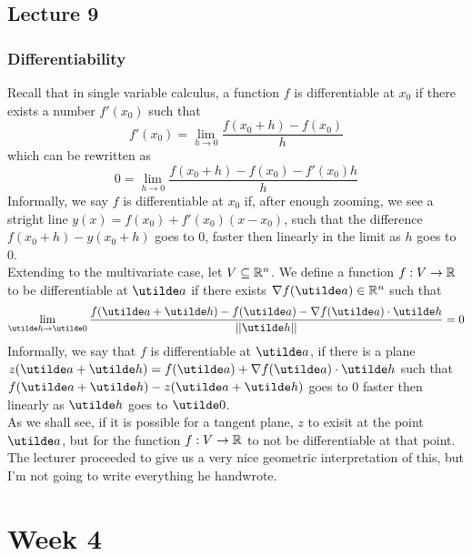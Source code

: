 \documentclass{report}
\begin{document}
\section{Lecture 9}
\subsection*{Differentiability}
Recall that in single variable calculus, a function $f$ is differentiable at $x_0$ if there exists a number $f'(x_0)$ such that
$$
	f'(x_0) = \lim_{h\to0} \frac{f(x_0 + h) - f(x_0)}{h} 
$$
which can be rewritten as 
$$
	0 = \lim_{h\to0} \frac{f(x_0 + h) - f(x_0) - f'(x_0)h}{h}
$$
Informally, we say $f$ is differentiable at $x_0$ if, after enough zooming, we see a stright line $y(x) = f(x_0)+f'(x_0)(x-x_0)$, such that the difference $f(x_0+h) - y(x_0+h)$ goes to 0, faster then linearly in the limit as $h$ goes to 0. \\

Extending to the multivariate case, let $V\subseteq \mathbb{R}^n$. We define a function $f:V\to\mathbb{R}$ to be differentiable at $\ut{a}$ if there exists $\grad f(\ut{a})\in\bbr^n$ such that 
$$
	\lim_{\ut{h}\to \ut{0}} \frac{f(\ut{a}+\ut{h}) - f(\ut{a}) - \grad f(\ut{a})\cd\ut{h}}{||\ut{h}||} = 0
$$
Informally, we say that $f$ is differentiable at $\ut{a}$, if there is a plane $z(\ut{a}+\ut{h}) = f(\ut{a}) + \grad f(\ut{a})\cd\ut{h}$ such that $f(\ut{a}+\ut{h}) - z(\ut{a}+\ut{h})$ goes to 0 faster then linearly as $\ut{h}$ goes to $\ut{0}$. \\

As we shall see, if it is possible for a tangent plane, $z$ to exisit at the point $\ut{a}$, but for the function $f:V\to\mathbb{R}$ to not be differentiable at that point. \\

The lecturer proceeded to give us a very nice geometric interpretation of this, but I'm not going to write everything he handwrote.



\chapter{Week 4}
\end{document}
